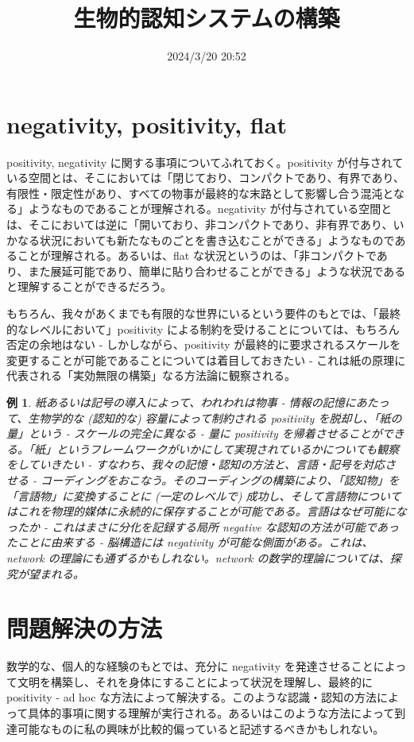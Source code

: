 \documentclass{jsarticle}
\title{生物的認知システムの構築}
\author{}
\date{2024/3/20 20:52}
\theoremstyle{break}
\newtheorem{ex}[thm]{例}
\begin{document}
\maketitle

\section{negativity, positivity, flat}
positivity, negativity に関する事項についてふれておく。positivity が付与されている空間とは、そこにおいては「閉じており、コンパクトであり、有界であり、有限性・限定性があり、すべての物事が最終的な末路として影響し合う混沌となる」ようなものであることが理解される。negativity が付与されている空間とは、そこにおいては逆に「開いており、非コンパクトであり、非有界であり、いかなる状況においても新たなものごとを書き込むことができる」ようなものであることが理解される。あるいは、flat な状況というのは、「非コンパクトであり、また展延可能であり、簡単に貼り合わせることができる」ような状況であると理解することができるだろう。

もちろん、我々があくまでも有限的な世界にいるという要件のもとでは、「最終的なレベルにおいて」positivity による制約を受けることについては、もちろん否定の余地はない - しかしながら、positivity が最終的に要求されるスケールを変更することが可能であることについては着目しておきたい - これは紙の原理に代表される「実効無限の構築」なる方法論に観察される。

\begin{ex}
紙あるいは記号の導入によって、われわれは物事 - 情報の記憶にあたって、生物学的な (認知的な) 容量によって制約される positivity を脱却し、「紙の量」という - スケールの完全に異なる - 量に positivity を帰着させることができる。「紙」というフレームワークがいかにして実現されているかについても観察をしていきたい - すなわち、我々の記憶・認知の方法と、言語・記号を対応させる - コーディングをおこなう。そのコーディングの構築により、「認知物」を「言語物」に変換することに (一定のレベルで) 成功し、そして言語物についてはこれを物理的媒体に永続的に保存することが可能である。言語はなぜ可能になったか - これはまさに分化を記録する局所 negative な認知の方法が可能であったことに由来する - 脳構造には negativity が可能な側面がある。これは、network の理論にも通ずるかもしれない。network の数学的理論については、探究が望まれる。
\end{ex}


\section{問題解決の方法}
数学的な、個人的な経験のもとでは、充分に negativity を発達させることによって文明を構築し、それを身体にすることによって状況を理解し、最終的に positivity - ad hoc な方法によって解決する。このような認識・認知の方法によって具体的事項に関する理解が実行される。あるいはこのような方法によって到達可能なものに私の興味が比較的偏っていると記述するべきかもしれない。
\end{document}
